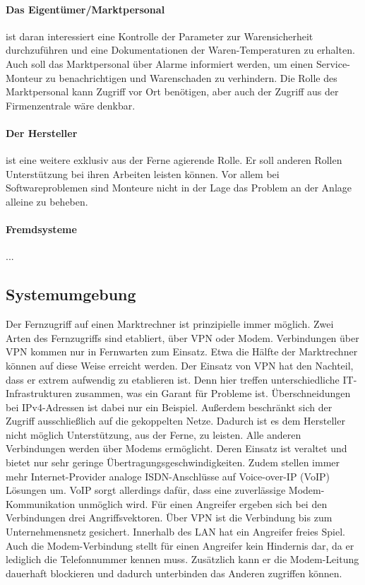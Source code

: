 \documentclass[11pt,a4paper]{report}
\begin{document}
\paragraph{Das Eigentümer/Marktpersonal} ist daran interessiert eine Kontrolle der Parameter zur Warensicherheit durchzuführen und eine Dokumentationen der Waren-Temperaturen zu erhalten. Auch soll das Marktpersonal über Alarme informiert werden, um einen Service-Monteur zu benachrichtigen und Warenschaden zu verhindern. Die Rolle des Marktpersonal kann Zugriff vor Ort benötigen, aber auch der Zugriff aus der Firmenzentrale wäre denkbar.
\paragraph{Der Hersteller} ist eine weitere exklusiv aus der Ferne agierende Rolle. Er soll anderen Rollen Unterstützung bei ihren Arbeiten leisten können. Vor allem bei Softwareproblemen sind Monteure nicht in der Lage das Problem an der Anlage alleine zu beheben.
\paragraph{Fremdsysteme} ...


\subsection{Systemumgebung}

Der Fernzugriff auf einen Marktrechner ist prinzipielle immer möglich. Zwei Arten des Fernzugriffs sind etabliert, über VPN oder Modem. Verbindungen über VPN kommen nur in Fernwarten zum Einsatz. Etwa die Hälfte der Marktrechner können auf diese Weise erreicht werden. Der Einsatz von VPN hat den Nachteil, dass er extrem aufwendig zu etablieren ist. Denn hier treffen unterschiedliche IT-Infrastrukturen zusammen, was ein Garant für Probleme ist. Überschneidungen bei IPv4-Adressen ist dabei nur ein Beispiel. Außerdem beschränkt sich der Zugriff ausschließlich auf die gekoppelten Netze. Dadurch ist es dem Hersteller nicht möglich Unterstützung, aus der Ferne, zu leisten. Alle anderen Verbindungen werden über Modems ermöglicht. Deren Einsatz ist veraltet und bietet nur sehr geringe Übertragungsgeschwindigkeiten. Zudem stellen immer mehr Internet-Provider analoge ISDN-Anschlüsse auf Voice-over-IP (VoIP) Lösungen um. VoIP sorgt allerdings dafür, dass eine zuverlässige Modem-Kommunikation unmöglich wird. Für einen Angreifer ergeben sich bei den Verbindungen drei Angriffsvektoren. Über VPN ist die Verbindung bis zum Unternehmensnetz gesichert. Innerhalb des LAN hat ein Angreifer freies Spiel. Auch die Modem-Verbindung stellt für einen Angreifer kein Hindernis dar, da er lediglich die Telefonnummer kennen muss. Zusätzlich kann er die Modem-Leitung dauerhaft blockieren und dadurch unterbinden das Anderen zugriffen können.
\end{document}
